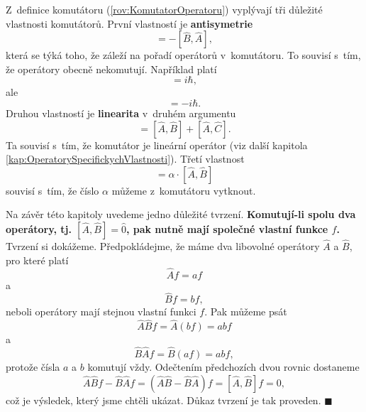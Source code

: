 Z~definice komutátoru (\ref{rov:KomutatorOperatoru}) vyplývají tři důležité vlastnosti komutátorů. První vlastností je \textbf{antisymetrie}
\begin{equation}
[\hat{A},\hat{B}] = -[\hat{B},\hat{A}],
\label{rov:VlastnostKomutatoru1}
\end{equation}
která se týká toho, že záleží na pořadí operátorů v~komutátoru. To souvisí s~tím, že operátory obecně nekomutují. Například platí
\begin{equation}
[\hat{r},\hat{p}]= i \hbar,
\nonumber
\end{equation}
ale
\begin{equation}
[\hat{p},\hat{r}]= - i \hbar.
\nonumber
\end{equation}
Druhou vlastností je \textbf{linearita} v~druhém argumentu
\begin{equation}
[\hat{A},\hat{B}+\hat{C}] = [\hat{A},\hat{B}] + [\hat{A},\hat{C}].
\label{rov:VlastnostKomutatoru2}
\end{equation}
Ta souvisí s~tím, že komutátor je lineární operátor (viz další kapitola \ref{kap:OperatorySpecifickychVlastnosti}). Třetí vlastnost
\begin{equation}
[\alpha \cdot \hat{A},\hat{B}] = \alpha \cdot [\hat{A},\hat{B}]
\label{rov:VlastnostKomutatoru3}
\end{equation}
souvisí s~tím, že číslo $\alpha$ můžeme z~komutátoru vytknout.

Na závěr této kapitoly uvedeme jedno důležité tvrzení. \textbf{Komutují-li spolu dva operátory, tj. $[\hat{A},\hat{B}]=\hat{0}$, pak nutně mají společné vlastní funkce $f$.} Tvrzení si dokážeme. Předpokládejme, že máme dva libovolné operátory $\hat{A}$ a $\hat{B}$, pro které platí
\begin{equation}
\hat{A} f = a f
\nonumber
\end{equation}
a
\begin{equation}
\hat{B} f = b f,
\nonumber
\end{equation}
neboli operátory mají stejnou vlastní funkci $f$. Pak můžeme psát
\begin{equation}
\hat{A}\hat{B} f = \hat{A} (b f) = a b f
\nonumber
\end{equation}
a 
\begin{equation}
\hat{B}\hat{A} f = \hat{B} (a f) = a b f,
\nonumber
\end{equation}
protože čísla $a$ a $b$ komutují vždy. Odečtením předchozích dvou rovnic dostaneme
\begin{equation}
\hat{A}\hat{B} f - \hat{B}\hat{A} f  = (\hat{A}\hat{B} - \hat{B}\hat{A} ) f = [\hat{A}, \hat{B}] f = 0,
\nonumber
\end{equation}
což je výsledek, který jsme chtěli ukázat. Důkaz tvrzení je tak proveden. \hfill {\footnotesize $\blacksquare$}

